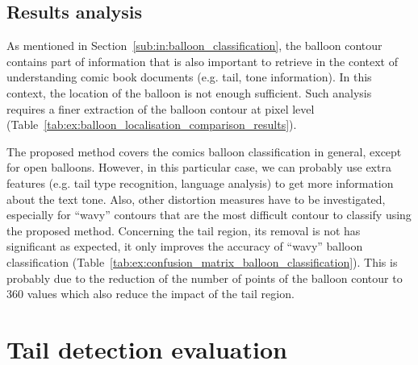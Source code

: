 \subsection{Results analysis} %
\label{par:balloon_classification_analysis}

As mentioned in Section~\ref{sub:in:balloon_classification}, the balloon contour contains part of information that is also important to retrieve in the context of understanding comic book documents (e.g. tail, tone information).
In this context, the location of the balloon is not enough sufficient.
Such analysis requires a finer extraction of the balloon contour at pixel level (Table~\ref{tab:ex:balloon_localisation_comparison_results}).

The proposed method covers the comics balloon classification in general, except for open balloons.
However, in this particular case, we can probably use extra features (e.g. tail type recognition, language analysis) to get more information about the text tone.
Also, other distortion measures have to be investigated, especially for ``wavy'' contours that are the most difficult contour to classify using the proposed method.
Concerning the tail region, its removal is not has significant as expected, it only improves the accuracy of ``wavy'' balloon classification (Table~\ref{tab:ex:confusion_matrix_balloon_classification}).
This is probably due to the reduction of the number of points of the balloon contour to 360 values which also reduce the impact of the tail region.





\section{Tail detection evaluation} %
\label{sec:tail_detection_evaluation}


